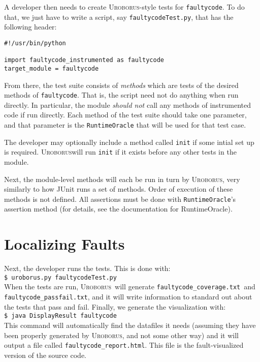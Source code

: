 \documentclass[english]{article}
\newcommand{\Uro}{\textsc{Uroborus}}
\newcommand{\fc}{\texttt{faultycode}}
\newcommand{\fcT}{\texttt{faultycodeTest.py}}
\newcommand{\fcc}{\texttt{faultycode\_coverage.txt}}
\newcommand{\fcpf}{\texttt{faultycode\_passfail.txt}}
\newcommand{\fch}{\texttt{faultycode\_report.html}}
\begin{document}
A developer then needs to create \Uro-style tests for \fc. To do that, we just have to write a
script, say \fcT, that has the following header:\\
\begin{verbatim}
#!/usr/bin/python

import faultycode_instrumented as faultycode
target_module = faultycode

\end{verbatim}

From there, the test suite consists of \emph{methods} which are tests of the desired methods of \fc. 
That is, the script need not do anything when run directly. In particular, the module \emph{should
not} call any methods of instrumented code if run directly. 
Each method of the test suite should take one parameter, and that parameter is the
\texttt{RuntimeOracle} that will be used for that test case.

The developer may optionally include a method called \texttt{init} if some intial set up is
required. \Uro will run \texttt{init} if it exists before any other tests in the module.

Next, the module-level methods will each be
run in turn by \Uro, very similarly to how JUnit runs a set of methods. Order of execution of these
methods is not defined.
All assertions must be
done with \texttt{RuntimeOracle}'s assertion method (for details, see the documentation for RuntimeOracle).

\section{Localizing Faults}

Next, the developer runs the tests. This is done with:\\

\texttt{\$ uroborus.py }\fcT \\

When the tests are run, \Uro\
will generate \fcc\ and \fcpf, and it will write information to standard out about the tests that
pass and fail. Finally, we generate the visualization with:\\

\texttt{\$ java DisplayResult }\fc \\

This command will automatically find the datafiles it needs (assuming they have been properly
generated by \Uro, and not some other way) and it will output a file called \fch. This file is
the fault-visualized version of the source code.




\end{document}
